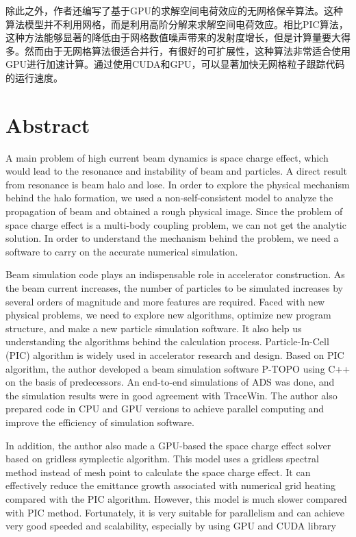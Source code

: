 除此之外，作者还编写了基于GPU的求解空间电荷效应的无网格保辛算法。这种算法模型并不利用网格，而是利用高阶分解来求解空间电荷效应。相比PIC算法，这种方法能够显著的降低由于网格数值噪声带来的发射度增长，但是计算量要大得多。然而由于无网格算法很适合并行，有很好的可扩展性，这种算法非常适合使用GPU进行加速计算。通过使用CUDA和GPU，可以显著加快无网格粒子跟踪代码的运行速度。



\chapter{Abstract}%

A main problem of high current beam dynamics is space charge effect, which would lead to the resonance and instability of beam and particles. A direct result from resonance is beam halo and lose.
In order to explore the physical mechanism behind the halo formation, we used a non-self-consistent model to analyze the propagation of beam and obtained a rough physical image.
Since the problem of space charge effect is a multi-body coupling problem, we can not get the analytic solution. In order to understand the mechanism behind the problem, we need a software to carry on the accurate numerical simulation.

Beam simulation code plays an indispensable role in accelerator construction.
As the beam current increases, the number of particles to be simulated increases by several orders of magnitude
and more features are required.
Faced with new physical problems, we need to explore new algorithms, optimize new program structure, and make a new particle simulation software.
It also help us understanding the algorithms behind the calculation process.
Particle-In-Cell (PIC) algorithm is widely used in accelerator research and design.
Based on PIC algorithm, the author developed a beam simulation software P-TOPO using C++ on the basis of predecessors.
An end-to-end simulations of ADS was done, and the simulation results were in good agreement with TraceWin.
The author also prepared code in CPU and GPU versions to achieve parallel computing and improve the efficiency of simulation software.

In addition, the author also made a GPU-based the space charge effect solver based on gridless symplectic algorithm.
This model uses a gridless spectral method instead of mesh point to calculate the space charge effect.
It can effectively reduce the emittance growth associated with numerical grid heating compared with the PIC algorithm.
However, this model is much slower compared with PIC method.
Fortunately, it is very suitable for parallelism and can achieve very good speeded and scalability, especially by using GPU and CUDA library

